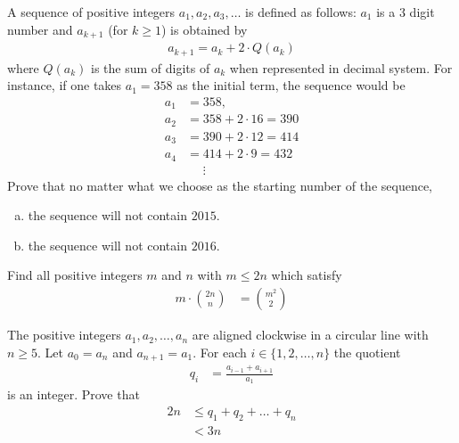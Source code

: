 \documentclass[problems.tex]{subfile}
\begin{document}
	\begin{problem}
		A sequence of positive integers $a_1, a_2, a_3, \dots$ is defined as follows: $a_1$ is a $3$ digit number and $a_{k+1}$ (for $k \geq 1$) is obtained by
		\begin{align*}
			a_{k+1} = a_k + 2 \cdot Q(a_k)
		\end{align*}
		where $Q(a_k)$ is the sum of digits of $a_k$ when represented in decimal system. For instance, if one takes $a_1 = 358$ as the initial term, the sequence would be
		\begin{align*}
			a_1 &= 358,\\
			a_2 &= 358 + 2 \cdot 16 = 390\\
			a_3 &= 390+ 2 \cdot 12 = 414\\
			a_4 &= 414 + 2 \cdot 9 = 432\\
			&\phantom{=}\vdots
		\end{align*}
		Prove that no matter what we choose as the starting number of the sequence,
		\begin{enumerate}[(a)]
			\item the sequence will not contain $2015$.
			\item the sequence will not contain $2016$.
		\end{enumerate}
	\end{problem}

	\begin{problem}
		Find all positive integers $m$ and $n$ with $m \leq 2n$ which satisfy
		\begin{align*}
			m \cdot \binom{2n}{n}
				& = \binom{m^2}{2}
		\end{align*}
	\end{problem}

	\begin{problem}
		The positive integers $a_1,a_2, \dots, a_n$ are aligned clockwise in a circular line with $n \geq 5$. Let $a_0=a_n$ and $a_{n+1}=a_1$. For each $i \in \{1,2,\dots,n \}$ the quotient
			\begin{align*}
				q_i
					& =\frac{a_{i-1}+a_{i+1}}{a_1}
			\end{align*}
		is an integer. Prove that
			\begin{align*}
				2n
					& \leq q_1+q_2+\dots+q_n\\
					& < 3n
			\end{align*}
	\end{problem}
\end{document}
